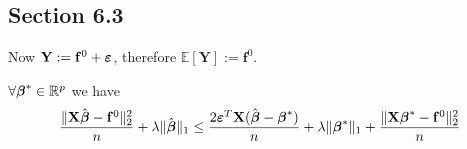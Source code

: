 \subsection{Section 6.3}

Now $\mathbf{Y} :=\mathbf{f}^{0} + \boldsymbol{\varepsilon}$, therefore $\mathbb{E} [\mathbf{Y}] :=\mathbf{f}^{0}$.


\begin{lemma}
    $\forall \boldsymbol{\beta}^* \in \mathbb{R}^p$ we have
    \begin{equation}
        \frac{\|\mathbf{X} \hat {\boldsymbol{\beta}} - \mathbf{f}^0 \|_{2}^{2}}{n} + \lambda\| \hat {\boldsymbol{\beta}} \|_{1} \leq \frac{2 \boldsymbol{\varepsilon}^T \mathbf{X} (\hat{\boldsymbol{\beta}} - \boldsymbol{\beta}^*)}{n} + \lambda \| \boldsymbol{\beta}^*\|_{1} + \frac{\|\mathbf{X} \boldsymbol{\beta}^* - \mathbf{f}^0\|_{2}^{2}}{n}
    \end{equation}
\end{lemma}
